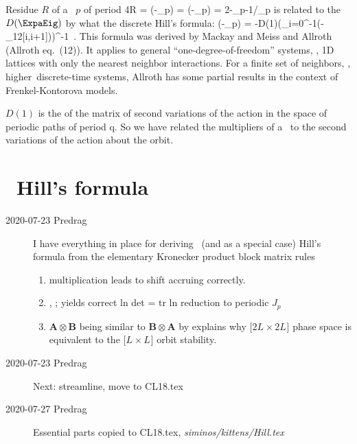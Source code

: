 Residue $R$ of a \po\ $p$ of period 
\beq
4R = \det(\matId-\jMps_p)
   = \tr(\matId-\jMps_p)
   = 2-\ExpaEig_p-1/\ExpaEig_p
is related to the {\HillDet} $D(\ExpaEig)$ by
what the discrete Hill's formula:
\beq
\det (\matId-\jMps_p) = -D(1)\left(\prod_{i=0}^{-1}(-\genF_{12}[i,i+1])\right)^{-1}
\,.
This formula was derived by Mackay and Meiss and
Allroth (Allroth eq.~(12)). It applies to general
``one-degree-of-freedom'' systems, \ie, 1D lattices with only the nearest
neighbor interactions. For a finite set of neighbors, \ie, higher\dmn\
discrete-time systems, Allroth has some partial results in the
context of Frenkel-Kontorova models.

$D(1)$ is the {\HillDet} of the matrix of second variations of
the action in the space of periodic paths of period q. So we have related the
multipliers of a \po\ to the second variations of the action about
the orbit.

\newpage %
\renewcommand\speriod[1]{{\ensuremath{L_{#1}}}}  %
\renewcommand\period[1]{{\ensuremath{T_{#1}}}}  %
%
\section{\catLatt\ Hill's formula}
\label{sect:catlattHill}

\begin{description}
  \item[2020-07-23 Predrag]
I have everything in place for deriving \catlatt\ (and \templatt as a special
case) Hill's formula from the elementary Kronecker product
 block matrix rules
    \begin{enumerate}
      \item multiplication  leads to
            shift  accruing correctly.
      \item {\HillDet} , ;
            yields correct ln det = tr ln reduction to periodic $J_p$
      \item $\mathbf{A}\otimes\mathbf{B}$ being similar to
            $\mathbf{B}\otimes\mathbf{A}$ by  explains why
            [$2\speriod{}\!\times\!2\speriod{}$] phase space is
            equivalent to the [$\speriod{}\!\times\!\speriod{}$] orbit
            stability.
    \end{enumerate}
  \item[2020-07-23 Predrag]
Next: streamline, move to CL18.tex
  \item[2020-07-27 Predrag]
Essential parts copied to CL18.tex, \emph{siminos/kittens/Hill.tex}
\end{description}

